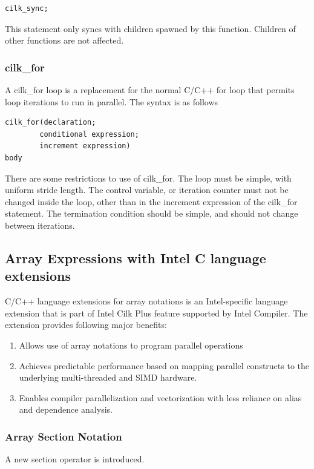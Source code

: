 \documentclass[]{scrartcl}
\begin{document}
\begin{lstlisting}
cilk_sync;
\end{lstlisting}

This statement only syncs with children spawned by this function. Children of other functions are not affected.

\subsubsection{cilk\_for}
A cilk\_for loop is a replacement for the normal C/C++ for loop that permits loop iterations 
to run in parallel. The syntax is as follows

\begin{lstlisting}
cilk_for(declaration; 
		conditional expression; 
		increment expression)
body
\end{lstlisting}

There are some restrictions to use of cilk\_for. The loop must be simple, with uniform
stride length. The control variable, or iteration counter must not be changed inside the 
loop, other than in the increment expression of the cilk\_for statement. The termination
condition should be simple, and should not change between iterations.

\pagebreak
\subsection{Array Expressions with Intel C language extensions}
C/C++ language extensions for array notations is an Intel-specific language extension 
that is part of Intel Cilk Plus feature supported by Intel Compiler. The extension provides
following major benefits:

\begin{enumerate}
	\item Allows use of array notations to program parallel operations
	\item Achieves predictable performance based on mapping parallel constructs to the underlying multi-threaded and SIMD hardware.
	\item Enables compiler parallelization and vectorization with less reliance on alias and dependence analysis.
\end{enumerate}

\subsubsection{Array Section Notation}
A new section operator is introduced. 
\end{document}
